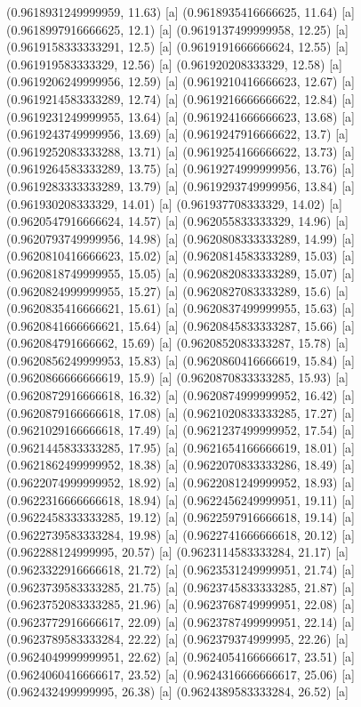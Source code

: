 {{{(0.9618931249999959, 11.63) [a] 
(0.9618935416666625, 11.64) [a] 
(0.9618997916666625, 12.1) [a] 
(0.9619137499999958, 12.25) [a] 
(0.9619158333333291, 12.5) [a] 
(0.9619191666666624, 12.55) [a] 
(0.961919583333329, 12.56) [a] 
(0.961920208333329, 12.58) [a] 
(0.9619206249999956, 12.59) [a] 
(0.9619210416666623, 12.67) [a] 
(0.9619214583333289, 12.74) [a] 
(0.9619216666666622, 12.84) [a] 
(0.9619231249999955, 13.64) [a] 
(0.9619241666666623, 13.68) [a] 
(0.9619243749999956, 13.69) [a] 
(0.9619247916666622, 13.7) [a] 
(0.9619252083333288, 13.71) [a] 
(0.9619254166666622, 13.73) [a] 
(0.9619264583333289, 13.75) [a] 
(0.9619274999999956, 13.76) [a] 
(0.9619283333333289, 13.79) [a] 
(0.9619293749999956, 13.84) [a] 
(0.961930208333329, 14.01) [a] 
(0.961937708333329, 14.02) [a] 
(0.9620547916666624, 14.57) [a] 
(0.962055833333329, 14.96) [a] 
(0.9620793749999956, 14.98) [a] 
(0.9620808333333289, 14.99) [a] 
(0.9620810416666623, 15.02) [a] 
(0.9620814583333289, 15.03) [a] 
(0.9620818749999955, 15.05) [a] 
(0.9620820833333289, 15.07) [a] 
(0.9620824999999955, 15.27) [a] 
(0.9620827083333289, 15.6) [a] 
(0.9620835416666621, 15.61) [a] 
(0.9620837499999955, 15.63) [a] 
(0.9620841666666621, 15.64) [a] 
(0.9620845833333287, 15.66) [a] 
(0.962084791666662, 15.69) [a] 
(0.9620852083333287, 15.78) [a] 
(0.9620856249999953, 15.83) [a] 
(0.9620860416666619, 15.84) [a] 
(0.9620866666666619, 15.9) [a] 
(0.9620870833333285, 15.93) [a] 
(0.9620872916666618, 16.32) [a] 
(0.9620874999999952, 16.42) [a] 
(0.9620879166666618, 17.08) [a] 
(0.9621020833333285, 17.27) [a] 
(0.9621029166666618, 17.49) [a] 
(0.9621237499999952, 17.54) [a] 
(0.9621445833333285, 17.95) [a] 
(0.9621654166666619, 18.01) [a] 
(0.9621862499999952, 18.38) [a] 
(0.9622070833333286, 18.49) [a] 
(0.9622074999999952, 18.92) [a] 
(0.9622081249999952, 18.93) [a] 
(0.9622316666666618, 18.94) [a] 
(0.9622456249999951, 19.11) [a] 
(0.9622458333333285, 19.12) [a] 
(0.9622597916666618, 19.14) [a] 
(0.9622739583333284, 19.98) [a] 
(0.9622741666666618, 20.12) [a] 
(0.962288124999995, 20.57) [a] 
(0.9623114583333284, 21.17) [a] 
(0.9623322916666618, 21.72) [a] 
(0.9623531249999951, 21.74) [a] 
(0.9623739583333285, 21.75) [a] 
(0.9623745833333285, 21.87) [a] 
(0.9623752083333285, 21.96) [a] 
(0.9623768749999951, 22.08) [a] 
(0.9623772916666617, 22.09) [a] 
(0.9623787499999951, 22.14) [a] 
(0.9623789583333284, 22.22) [a] 
(0.962379374999995, 22.26) [a] 
(0.9624049999999951, 22.62) [a] 
(0.9624054166666617, 23.51) [a] 
(0.9624060416666617, 23.52) [a] 
(0.9624316666666617, 25.06) [a] 
(0.962432499999995, 26.38) [a] 
(0.9624389583333284, 26.52) [a] 
}}}

